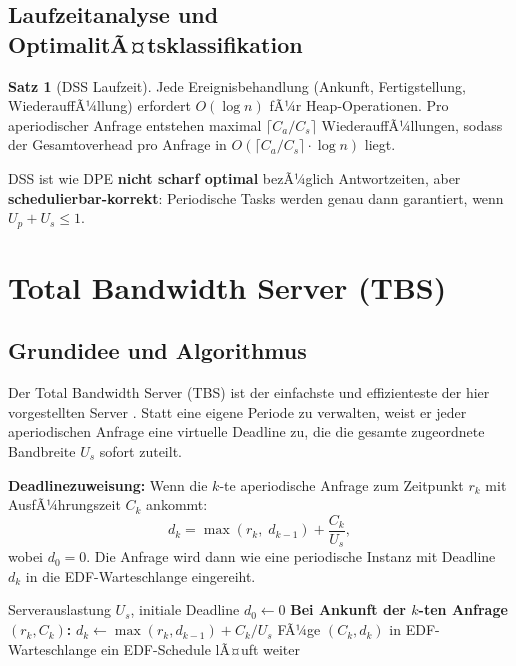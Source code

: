 ﻿\documentclass[a4paper,12pt]{report}
\theoremstyle{definition}
\newtheorem{satz}{Satz}[chapter]
\begin{document}
\subsection{Laufzeitanalyse und OptimalitÃ¤tsklassifikation}

\begin{satz}[DSS Laufzeit]
	Jede Ereignisbehandlung (Ankunft, Fertigstellung, WiederauffÃ¼llung) erfordert
	$O(\log n)$ fÃ¼r Heap-Operationen. Pro aperiodischer Anfrage entstehen maximal
	$\lceil C_a/C_s \rceil$ WiederauffÃ¼llungen, sodass der Gesamtoverhead
	pro Anfrage in $O(\lceil C_a/C_s \rceil \cdot \log n)$ liegt.
\end{satz}

DSS ist wie DPE \textbf{nicht scharf optimal} bezÃ¼glich Antwortzeiten, aber
\textbf{schedulierbar-korrekt}: Periodische Tasks werden genau dann garantiert, wenn
$U_p + U_s \leq 1$.

\section{Total Bandwidth Server (TBS)}

\subsection{Grundidee und Algorithmus}

Der Total Bandwidth Server (TBS) ist der einfachste und effizienteste der hier
vorgestellten Server \cite{Spuri1996}. Statt eine eigene Periode zu verwalten,
weist er jeder aperiodischen Anfrage eine virtuelle Deadline zu, die die gesamte
zugeordnete Bandbreite $U_s$ sofort zuteilt.

\textbf{Deadlinezuweisung:} Wenn die $k$-te aperiodische Anfrage zum Zeitpunkt
$r_k$ mit AusfÃ¼hrungszeit $C_k$ ankommt:
\[
	d_k = \max(r_k,\; d_{k-1}) + \frac{C_k}{U_s},
\]
wobei $d_0 = 0$. Die Anfrage wird dann wie eine periodische Instanz mit Deadline
$d_k$ in die EDF-Warteschlange eingereiht.

\begin{algorithm}[H]
	\caption{Total Bandwidth Server}
	\begin{algorithmic}[1]
		\Require Serverauslastung $U_s$, initiale Deadline $d_0 \leftarrow 0$
		\State
		\State \textbf{Bei Ankunft der $k$-ten Anfrage $(r_k, C_k)$:}
		\State $d_k \leftarrow \max(r_k, d_{k-1}) + C_k / U_s$
		\State FÃ¼ge $(C_k, d_k)$ in EDF-Warteschlange ein
		\State EDF-Schedule lÃ¤uft weiter
	\end{algorithmic}
\end{algorithm}
\end{document}
